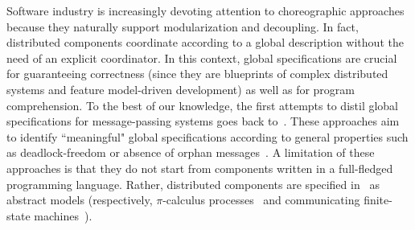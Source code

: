 Software industry is
increasingly devoting attention to choreographic approaches
\cite{BPMN,bon18,fmmt20,DBLP:journals/software/AutiliIT15} because
they naturally support modularization and decoupling.
%
In fact, distributed components coordinate according to a global
description without the need of an explicit coordinator.
%
In this context, global specifications are crucial for guaranteeing
correctness (since they are blueprints of complex distributed systems
and feature model-driven development) as well as for program
comprehension.
%
To the best of our knowledge, the first attempts to distil global
specifications for message-passing systems goes back
to~\cite{myh09,lt12,lty15}.
%
These approaches aim to identify ``meaningful" global specifications
according to general properties such as deadlock-freedom or absence of
orphan messages~\cite{bz83}.
%
A limitation of these approaches is that they do not start from
components written in a full-fledged programming language.
%
Rather, distributed components are specified in~\cite{lt12,lty15} as
abstract models (respectively, $\pi$-calculus
processes~\cite{sw02,mil99,mpw92} and communicating finite-state
machines~\cite{bz83}).


